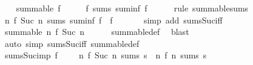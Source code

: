 \begin{isabellebody}
%
\isadelimproof
%
\endisadelimproof
%
\isatagproof
{}\isamarkupfalse%
\isanewline
\ \ \isamarkupfalse%
\ {\isachardoublequoteopen}summable\ f{\isachardoublequoteclose}\isanewline
\ \ \isamarkupfalse%
\ \isamarkupfalse%
\ {\isachardoublequoteopen}f\ sums\ suminf\ f{\isachardoublequoteclose}\isanewline
\ \ \ \ \isamarkupfalse%
\ {\isacharparenleft}{\kern0pt}rule\ summable{\isacharunderscore}{\kern0pt}sums{\isacharparenright}{\kern0pt}\isanewline
\ \ \isamarkupfalse%
\ \isamarkupfalse%
\ {\isachardoublequoteopen}{\isacharparenleft}{\kern0pt}{\isasymlambda}n{\isachardot}{\kern0pt}\ f\ {\isacharparenleft}{\kern0pt}Suc\ n{\isacharparenright}{\kern0pt}{\isacharparenright}{\kern0pt}\ sums\ {\isacharparenleft}{\kern0pt}suminf\ f\ {\isacharminus}{\kern0pt}\ f\ {}{\isacharparenright}{\kern0pt}{\isachardoublequoteclose}\isanewline
\ \ \ \ \isamarkupfalse%
\ {\isacharparenleft}{\kern0pt}simp\ add{\isacharcolon}{\kern0pt}\ sums{\isacharunderscore}{\kern0pt}Suc{\isacharunderscore}{\kern0pt}iff{\isacharparenright}{\kern0pt}\isanewline
\ \ \isamarkupfalse%
\ \isamarkupfalse%
\ {\isachardoublequoteopen}summable\ {\isacharparenleft}{\kern0pt}{\isasymlambda}n{\isachardot}{\kern0pt}\ f\ {\isacharparenleft}{\kern0pt}Suc\ n{\isacharparenright}{\kern0pt}{\isacharparenright}{\kern0pt}{\isachardoublequoteclose}\isanewline
\ \ \ \ \isamarkupfalse%
\ summable{\isacharunderscore}{\kern0pt}def\ \isamarkupfalse%
\ blast\isanewline
{}\isamarkupfalse%
\ {\isacharparenleft}{\kern0pt}auto\ simp{\isacharcolon}{\kern0pt}\ sums{\isacharunderscore}{\kern0pt}Suc{\isacharunderscore}{\kern0pt}iff\ summable{\isacharunderscore}{\kern0pt}def{\isacharparenright}{\kern0pt}%
\endisatagproof
{\isafoldproof}%
%
\isadelimproof
\isanewline
%
\endisadelimproof
\isanewline
{}\isamarkupfalse%
\ sums{\isacharunderscore}{\kern0pt}Suc{\isacharunderscore}{\kern0pt}imp{\isacharcolon}{\kern0pt}\ {\isachardoublequoteopen}f\ {}\ {\isacharequal}{\kern0pt}\ {}\ {\isasymLongrightarrow}\ {\isacharparenleft}{\kern0pt}{\isasymlambda}n{\isachardot}{\kern0pt}\ f\ {\isacharparenleft}{\kern0pt}Suc\ n{\isacharparenright}{\kern0pt}{\isacharparenright}{\kern0pt}\ sums\ s\ {\isasymLongrightarrow}\ {\isacharparenleft}{\kern0pt}{\isasymlambda}n{\isachardot}{\kern0pt}\ f\ n{\isacharparenright}{\kern0pt}\ sums\ s{\isachardoublequoteclose}\isanewline
%
\isadelimproof
\ \ %

\end{isabellebody}
